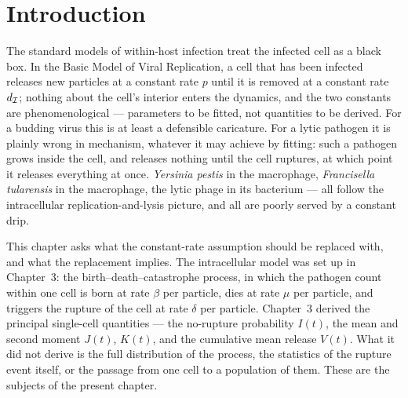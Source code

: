 
\section{Introduction}

The standard models of within-host infection treat the infected cell as a
black box. In the Basic Model of Viral Replication, a cell that has been
infected releases new particles at a constant rate $p$ until it is removed
at a constant rate $d_{\mathcal{I}}$; nothing about the cell's interior enters
the dynamics, and the two constants are phenomenological --- parameters to
be fitted, not quantities to be derived. For a budding virus this is at
least a defensible caricature. For a lytic pathogen it is plainly wrong in
mechanism, whatever it may achieve by fitting: such a pathogen grows inside
the cell, and releases nothing until the cell ruptures, at which point it
releases everything at once. \textit{Yersinia pestis} in the macrophage,
\textit{Francisella tularensis} in the macrophage, the lytic phage in its
bacterium --- all follow the intracellular replication-and-lysis picture,
and all are poorly served by a constant drip.

This chapter asks what the constant-rate assumption should be replaced
with, and what the replacement implies. The intracellular model was set up
in Chapter~3: the birth--death--catastrophe process, in which the
pathogen count within one cell is born at rate $\beta$ per particle, dies
at rate $\mu$ per particle, and triggers the rupture of the cell at rate
$\delta$ per particle. Chapter~3 derived the principal single-cell
quantities --- the no-rupture probability $I(t)$, the mean and second
moment $J(t)$, $K(t)$, and the cumulative mean release $V(t)$. What it did
not derive is the full distribution of the process, the statistics of the
rupture event itself, or the passage from one cell to a population of them.
These are the subjects of the present chapter.

